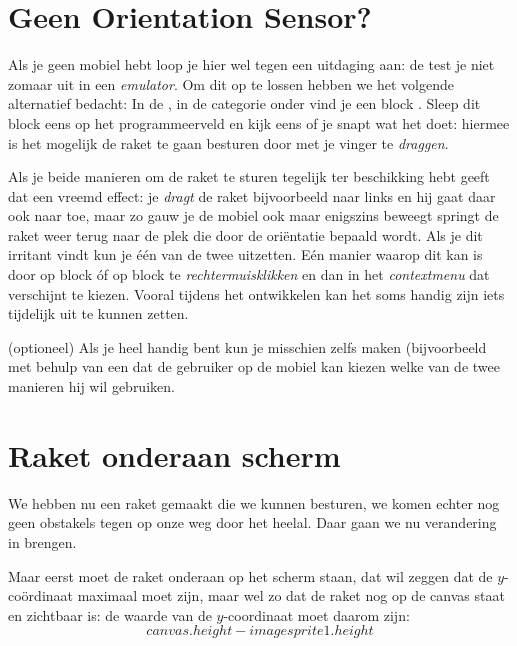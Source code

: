 \section{Geen Orientation Sensor?}
Als je geen mobiel hebt loop je hier wel tegen een uitdaging aan: de  test je niet zomaar uit in een \emph{emulator}. Om dit op te lossen hebben we het volgende alternatief bedacht:
In de , in de categorie  onder  vind je een block . Sleep dit block eens op het programmeerveld en kijk eens of je snapt wat het doet: hiermee is het mogelijk de raket te gaan besturen door met je vinger te \emph{draggen}.

Als je beide manieren om de raket te sturen tegelijk ter beschikking hebt geeft dat een vreemd effect: je \emph{dragt} de raket bijvoorbeeld naar links en hij gaat daar ook naar toe, maar zo gauw je de mobiel ook maar enigszins beweegt springt de raket weer terug naar de plek die door de ori\"entatie bepaald wordt. Als je dit irritant vindt kun je \'e\'en van de twee uitzetten. E\'en manier waarop dit kan is door op block 
\linebreak {} \'of op block  te \emph{rechtermuisklikken} en dan in het \emph{contextmenu} dat verschijnt  te kiezen. 	
Vooral tijdens het ontwikkelen kan het soms handig zijn iets tijdelijk uit te kunnen zetten. 
\begin{opgave}
   \opgVraag (optioneel)
	Als je heel handig bent kun je misschien zelfs maken (bijvoorbeeld met behulp van een  dat de gebruiker op de mobiel 
	kan kiezen welke van de twee manieren hij wil gebruiken.
\end{opgave}






\section{Raket onderaan scherm}
We hebben nu een raket gemaakt die we kunnen besturen, we komen echter nog geen obstakels tegen op onze weg door het heelal. Daar gaan we nu verandering in brengen. 

Maar eerst moet de raket onderaan op het scherm staan, dat wil zeggen dat de $y$-co\"ordinaat maximaal moet zijn, maar wel zo dat de raket nog op de canvas staat en zichtbaar is: de waarde van de $y$-coordinaat moet daarom zijn:  
\[
	canvas.height - imagesprite1.height  
\]

